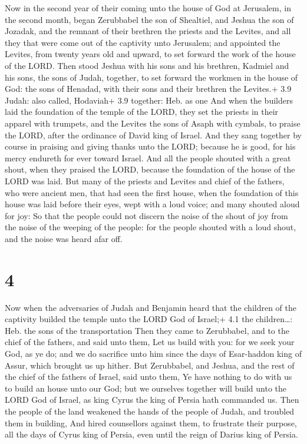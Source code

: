 Now in the second year of their coming unto the house of
God at Jerusalem, in the second month, began Zerubbabel the son of
Shealtiel, and Jeshua the son of Jozadak, and the remnant of their
brethren the priests and the Levites, and all they that were come out of
the captivity unto Jerusalem; and appointed the Levites, from twenty
years old and upward, to set forward the work of the house of the LORD.
 Then stood Jeshua with his sons and his brethren, Kadmiel
and his sons, the sons of Judah, together, to set forward the workmen in
the house of God: the sons of Henadad, with their sons and their
brethren the Levites.+ 3.9 Judah: also called, Hodaviah+ 3.9 together:
Heb. as one  And when the builders laid the foundation of
the temple of the LORD, they set the priests in their apparel with
trumpets, and the Levites the sons of Asaph with cymbals, to praise the
LORD, after the ordinance of David king of Israel.  And
they sang together by course in praising and giving thanks unto the
LORD; because he is good, for his mercy endureth for ever toward Israel.
And all the people shouted with a great shout, when they praised the
LORD, because the foundation of the house of the LORD was laid.
 But many of the priests and Levites and chief of the
fathers, who were ancient men, that had seen the first house, when the
foundation of this house was laid before their eyes, wept with a loud
voice; and many shouted aloud for joy:  So that the people
could not discern the noise of the shout of joy from the noise of the
weeping of the people: for the people shouted with a loud shout, and the
noise was heard afar off.

\hypertarget{section-3}{%
\section{4}\label{section-3}}

 Now when the adversaries of Judah and Benjamin heard that
the children of the captivity builded the temple unto the LORD God of
Israel;+ 4.1 the children\ldots: Heb. the sons of the transportation
 Then they came to Zerubbabel, and to the chief of the
fathers, and said unto them, Let us build with you: for we seek your
God, as ye do; and we do sacrifice unto him since the days of
Esar-haddon king of Assur, which brought us up hither.  But
Zerubbabel, and Jeshua, and the rest of the chief of the fathers of
Israel, said unto them, Ye have nothing to do with us to build an house
unto our God; but we ourselves together will build unto the LORD God of
Israel, as king Cyrus the king of Persia hath commanded us. 
Then the people of the land weakened the hands of the people of Judah,
and troubled them in building,  And hired counsellors
against them, to frustrate their purpose, all the days of Cyrus king of
Persia, even until the reign of Darius king of Persia.

